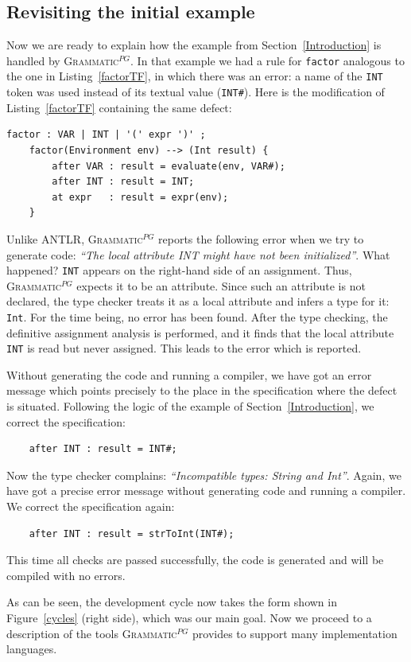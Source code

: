 \documentclass{llncs2e/llncs}
\newcommand{\lstref}[1]{Listing~\ref{#1}}
\newcommand{\figref}[1]{Figure~\ref{#1}}
\newcommand{\secref}[1]{Section~\ref{#1}}
\newcommand{\tool}[1]{\textsc{#1}}
\newcommand{\ATF}{\textsc{Grammatic}$^{PG}$}
\begin{document}
\subsection{Revisiting the initial example}

Now we are ready to explain how the example from \secref{Introduction} is handled by \ATF{}. In that example we had a rule for \texttt{factor} analogous to the one in \lstref{factorTF}, in which there was an error: a name of the \texttt{INT} token was used instead of its textual value (\texttt{INT\#}). Here is the modification of \lstref{factorTF} containing the same defect:
\begin{lstlisting}
factor : VAR | INT | '(' expr ')' ;          
	factor(Environment env) --> (Int result) { 
		after VAR : result = evaluate(env, VAR#);  
		after INT : result = INT;
		at expr   : result = expr(env);           
	}
\end{lstlisting}
Unlike \tool{ANTLR}, \ATF{} reports the following error when we try to generate code: \emph{``The local attribute INT might have not been initialized''}. What happened? \texttt{INT} appears on the right-hand side of an assignment. Thus, \ATF{} expects it to be an attribute. Since such an attribute is not declared, the type checker treats it as a local attribute and infers a type for it: \texttt{Int}. For the time being, no error has been found. After the type checking, the definitive assignment analysis is performed, and it finds that the local attribute \texttt{INT} is read but never assigned. This leads to the error which is reported.

Without generating the code and running a compiler, we have got an error message which points precisely to the place in the specification where the defect is situated. Following the logic of the example of \secref{Introduction}, we correct the specification:
\begin{lstlisting}
	after INT : result = INT#;
\end{lstlisting}
Now the type checker complains: \emph{``Incompatible types: String and Int''}. Again, we have got a precise error message without generating code and running a compiler. We correct the specification again:
\begin{lstlisting}
	after INT : result = strToInt(INT#);
\end{lstlisting}
This time all checks are passed successfully, the code is generated and will be compiled with no errors.

As can be seen, the development cycle now takes the form shown in \figref{cycles} (right side), which was our main goal. Now we proceed to a description of the tools \ATF{} provides to support many implementation languages.
\end{document}
